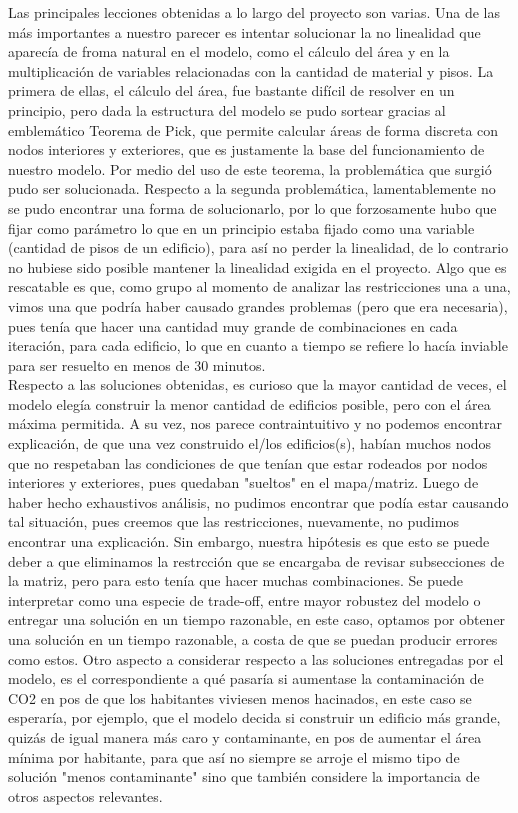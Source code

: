 \documentclass[letterpaper]{article}
\begin{document}
Las principales lecciones obtenidas a lo largo del proyecto son varias. Una de las más importantes a nuestro parecer es intentar solucionar la no linealidad que aparecía de froma natural 
en el modelo, como el cálculo del área y en la multiplicación de variables relacionadas con la cantidad de material y pisos. La primera de ellas, el cálculo del área, fue bastante difícil 
de resolver en un principio, pero dada la estructura del modelo se pudo sortear gracias al emblemático Teorema de Pick, que permite calcular áreas de forma discreta con nodos interiores y 
exteriores, que es justamente la base del funcionamiento de nuestro modelo. Por medio del uso de este teorema, la problemática que surgió pudo ser solucionada. Respecto a la segunda problemática, 
lamentablemente no se pudo encontrar una forma de solucionarlo, por lo que forzosamente hubo que fijar como parámetro lo que en un principio estaba fijado como una variable (cantidad de pisos de un
edificio), para así no perder la linealidad, de lo contrario no hubiese sido posible mantener la linealidad exigida en el proyecto. Algo que es rescatable es que, como grupo al momento de analizar 
las restricciones una a una, vimos una que podría haber causado grandes problemas (pero que era necesaria), pues tenía que hacer una cantidad muy grande de combinaciones en cada iteración, para cada 
edificio, lo que en cuanto a tiempo	se refiere lo hacía inviable para ser resuelto en menos de 30 minutos.\\

Respecto a las soluciones obtenidas, es curioso que la mayor cantidad de veces, el modelo elegía construir la menor cantidad de edificios posible, pero con el área máxima permitida. A su vez, 
nos parece contraintuitivo y no podemos encontrar explicación, de que una vez construido el/los edificios(s), habían muchos nodos que no respetaban las condiciones de que tenían que estar rodeados 
por nodos interiores y exteriores, pues quedaban "sueltos" en el mapa/matriz. Luego de haber hecho exhaustivos análisis, no pudimos encontrar que podía estar causando tal situación, pues creemos que 
las restricciones, nuevamente, no pudimos encontrar una explicación. Sin embargo, nuestra hipótesis es que esto se puede deber a que eliminamos la restrcción que se encargaba de revisar subsecciones 
de la matriz, pero para esto tenía que hacer muchas combinaciones. Se puede interpretar como una especie de trade-off, entre mayor robustez del modelo o entregar una solución en un tiempo razonable, 
en este caso, optamos por obtener una solución en un tiempo razonable, a costa de que se puedan producir errores como estos. Otro aspecto a considerar respecto a las soluciones entregadas por el modelo,
es el correspondiente a qué pasaría si aumentase la contaminación de CO2 en pos de que los habitantes viviesen menos hacinados, en este caso se esperaría, por ejemplo, que el modelo decida 
si construir un edificio más grande, quizás de igual manera más caro y contaminante, en pos de aumentar el área mínima por habitante, para que así no siempre se arroje el mismo tipo de solución "menos contaminante" sino que también
considere la importancia de otros aspectos relevantes.\\
\end{document}
